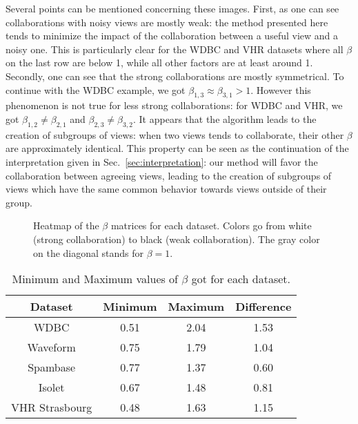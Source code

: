 Several points can be mentioned concerning these images. First, as one can see collaborations with noisy views are mostly weak:  the method presented here tends to minimize the impact of the collaboration between a useful view and a noisy one. This is particularly clear for the WDBC and VHR datasets where all $\beta$ on the last row are below 1, while all other factors are at least around 1. Secondly, one can see that the strong collaborations are mostly symmetrical. To continue with the WDBC example, we got $\beta_{1,3} \approx \beta_{3,1} > 1$. However this phenomenon is not true for less strong collaborations: for WDBC and VHR, we got $\beta_{1,2} \neq \beta_{2,1}$ and $\beta_{2,3} \neq \beta_{3,2}$. It appears that the algorithm leads to the creation of subgroups of views: when two views tends to collaborate, their other $\beta$ are approximately identical. This property can be seen as the continuation of the interpretation given in Sec.~\ref{sec:interpretation}: our method will favor the collaboration between agreeing views, leading to the creation of subgroups of views which have the same common behavior towards views outside of their group.

\begin{figure}[!h]
	\centering

    \centering
	\caption{Heatmap of the $\beta$ matrices for each dataset. Colors go from white (strong collaboration) to black (weak collaboration). The gray color on the diagonal stands for $\beta=1$.}
\label{fig:betas}
\end{figure}

\begin{table}[htbp]
	\caption{Minimum and Maximum values of $\beta$ got for each dataset.}
\label{tab:minmax}
	\begin{center}
		\begin{tabular}{cccc}
			\toprule
			Dataset & Minimum & Maximum & Difference
			\\
			\midrule
			WDBC & 0.51 & 2.04 & 1.53\\
			Waveform & 0.75 & 1.79 & 1.04\\
			Spambase & 0.77 & 1.37 & 0.60\\
			Isolet & 0.67 & 1.48 & 0.81\\
			VHR Strasbourg & 0.48 & 1.63 & 1.15\\
			\bottomrule
		\end{tabular}
	\end{center}
\end{table}

